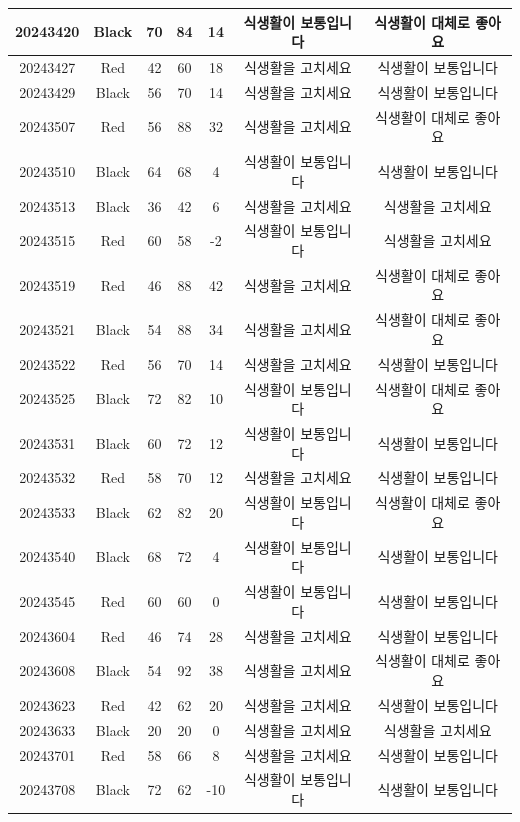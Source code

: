 \documentclass[
]{book}
\begin{document}
\begin{tabular}{c|c|c|c|c|c|c}
\hline
20243420 & Black & 70 & 84 & 14 & 식생활이 보통입니다 & 식생활이 대체로 좋아요\\
\hline
20243427 & Red & 42 & 60 & 18 & 식생활을 고치세요 & 식생활이 보통입니다\\
\hline
20243429 & Black & 56 & 70 & 14 & 식생활을 고치세요 & 식생활이 보통입니다\\
\hline
20243507 & Red & 56 & 88 & 32 & 식생활을 고치세요 & 식생활이 대체로 좋아요\\
\hline
20243510 & Black & 64 & 68 & 4 & 식생활이 보통입니다 & 식생활이 보통입니다\\
\hline
20243513 & Black & 36 & 42 & 6 & 식생활을 고치세요 & 식생활을 고치세요\\
\hline
20243515 & Red & 60 & 58 & -2 & 식생활이 보통입니다 & 식생활을 고치세요\\
\hline
20243519 & Red & 46 & 88 & 42 & 식생활을 고치세요 & 식생활이 대체로 좋아요\\
\hline
20243521 & Black & 54 & 88 & 34 & 식생활을 고치세요 & 식생활이 대체로 좋아요\\
\hline
20243522 & Red & 56 & 70 & 14 & 식생활을 고치세요 & 식생활이 보통입니다\\
\hline
20243525 & Black & 72 & 82 & 10 & 식생활이 보통입니다 & 식생활이 대체로 좋아요\\
\hline
20243531 & Black & 60 & 72 & 12 & 식생활이 보통입니다 & 식생활이 보통입니다\\
\hline
20243532 & Red & 58 & 70 & 12 & 식생활을 고치세요 & 식생활이 보통입니다\\
\hline
20243533 & Black & 62 & 82 & 20 & 식생활이 보통입니다 & 식생활이 대체로 좋아요\\
\hline
20243540 & Black & 68 & 72 & 4 & 식생활이 보통입니다 & 식생활이 보통입니다\\
\hline
20243545 & Red & 60 & 60 & 0 & 식생활이 보통입니다 & 식생활이 보통입니다\\
\hline
20243604 & Red & 46 & 74 & 28 & 식생활을 고치세요 & 식생활이 보통입니다\\
\hline
20243608 & Black & 54 & 92 & 38 & 식생활을 고치세요 & 식생활이 대체로 좋아요\\
\hline
20243623 & Red & 42 & 62 & 20 & 식생활을 고치세요 & 식생활이 보통입니다\\
\hline
20243633 & Black & 20 & 20 & 0 & 식생활을 고치세요 & 식생활을 고치세요\\
\hline
20243701 & Red & 58 & 66 & 8 & 식생활을 고치세요 & 식생활이 보통입니다\\
\hline
20243708 & Black & 72 & 62 & -10 & 식생활이 보통입니다 & 식생활이 보통입니다\\

\end{tabular}
\end{document}
